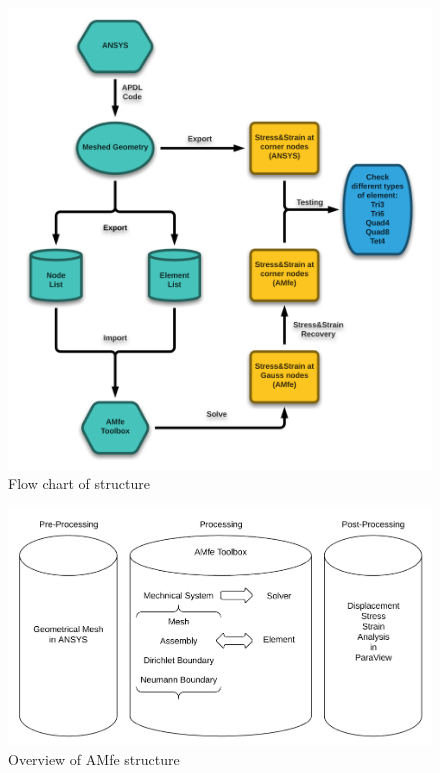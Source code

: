 \begin{figure}
	\begin{center}
		\includegraphics[width=12cm,clip]{Overview.pdf}			
		\caption{Flow chart of structure} \label{fig: Overview}
	\end{center}
\end{figure}

\begin{figure}
	\begin{center}
		\includegraphics[width=12cm,clip]{Overview2.pdf}			
		\caption{Overview of AMfe structure} \label{fig: Overview2}
	\end{center}
\end{figure}

